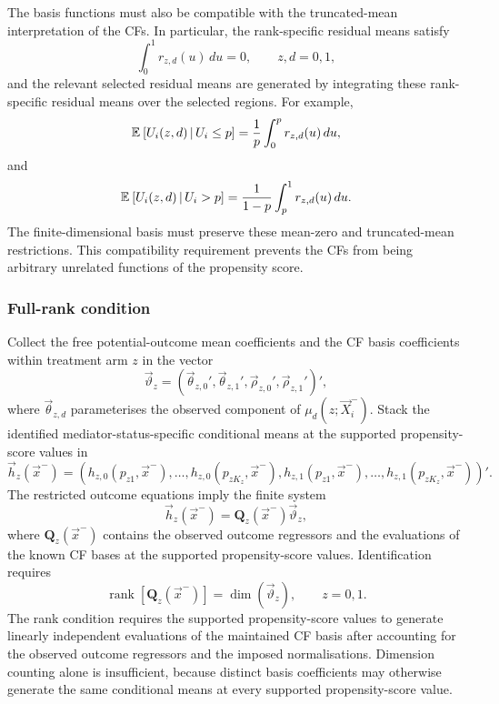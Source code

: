 The basis functions must also be compatible with the truncated-mean interpretation of the CFs.
In particular, the rank-specific residual means satisfy
\[
    \int_0^1
        r_{z,d}(u)
    \,du
    =
    0,
    \qquad
    z,d=0,1,
    \label{eqn:cf-zero-mean}
\]
and the relevant selected residual means are generated by integrating these rank-specific residual means over the selected regions.
For example,
\[
    \mathbb{E}_{} \left[ 
        U_i(z,d)
     \, \middle\vert \, 
        U_i\leq p
     \right]
    =
    \frac{1}{p}
    \int_0^p
        r_{z,d}(u)
    \,du,
\]
and
\[
    \mathbb{E}_{} \left[ 
        U_i(z,d)
     \, \middle\vert \, 
        U_i>p
     \right]
    =
    \frac{1}{1-p}
    \int_p^1
        r_{z,d}(u)
    \,du.
\]
The finite-dimensional basis must preserve these mean-zero and truncated-mean restrictions.
This compatibility requirement prevents the CFs from being arbitrary unrelated functions of the propensity score.

\subsubsection{Full-rank condition}

Collect the free potential-outcome mean coefficients and the CF basis coefficients within treatment arm $z$ in the vector
\[
    \vec\vartheta_z
    =
    \left(
        \vec\theta_{z,0}',
        \vec\theta_{z,1}',
        \vec\rho_{z,0}',
        \vec\rho_{z,1}'
    \right)',
\]
where $\vec\theta_{z,d}$ parameterises the observed component of $\mu_d(z;\vec X_i^-)$.
Stack the identified mediator-status-specific conditional means at the supported propensity-score values in
\[
    \vec h_z(\vec x^-)
    =
    \left(
        h_{z,0}(p_{z1},\vec x^-),
        \ldots,
        h_{z,0}(p_{zK_z},\vec x^-),
        h_{z,1}(p_{z1},\vec x^-),
        \ldots,
        h_{z,1}(p_{zK_z},\vec x^-)
    \right)'.
\]
The restricted outcome equations imply the finite system
\[
    \vec h_z(\vec x^-)
    =
    \mathbf Q_z(\vec x^-)
    \vec\vartheta_z,
    \label{eqn:restricted-cf-system}
\]
where $\mathbf Q_z(\vec x^-)$ contains the observed outcome regressors and the evaluations of the known CF bases at the supported propensity-score values.
Identification requires
\[
    \operatorname{rank}
    \left[
        \mathbf Q_z(\vec x^-)
    \right]
    =
    \dim
    \left(
        \vec\vartheta_z
    \right),
    \qquad
    z=0,1.
    \label{eqn:restricted-cf-rank}
\]
The rank condition requires the supported propensity-score values to generate linearly independent evaluations of the maintained CF basis after accounting for the observed outcome regressors and the imposed normalisations.
Dimension counting alone is insufficient, because distinct basis coefficients may otherwise generate the same conditional means at every supported propensity-score value.

